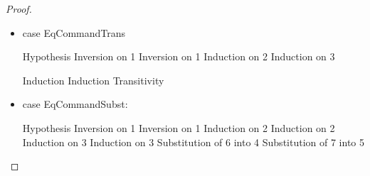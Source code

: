 \begin{proof}
\begin{itemize}
   \begin{eqnproof}
           {Induction on 2, above}
           {Symmetry on prev step}
   \end{eqnproof}

\item case EqCommandTrans
  \begin{eqnproof}
              {Hypothesis}
              {Inversion on 1}
              {Inversion on 1}
              {Induction on 2}
              {Induction on 3}
  \end{eqnproof}

  \begin{eqnproof}
          {Induction}
          {Induction}
          {Transitivity}
  \end{eqnproof}

\item case EqCommandSubst:
  \begin{eqnproof}
              {Hypothesis}
              {Inversion on 1}
              {Inversion on 1}
              {Induction on 2}
              {Induction on 2}
              {Induction on 3}
              {Induction on 3}
              {Substitution of 6 into 4}
              {Substitution of 7 into 5}
  \end{eqnproof}


\end{itemize}
\end{proof}
